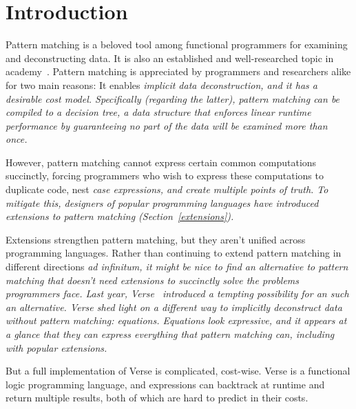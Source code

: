 \documentclass[manuscript,screen,review, 12pt, nonacm]{acmart}
\begin{document}
\section{Introduction}

Pattern matching is a beloved tool among functional programmers for examining
and deconstructing data. 
It is also an established and well-researched topic in
academy~\citep{burton1993pattern, palao1996new, wadler1987views, macqueen1985tree,
bpc}. Pattern matching is appreciated by programmers and researchers alike for
two main reasons: It enables \it{implicit} data deconstruction, and it has a
desirable cost model. Specifically (regarding the latter), pattern matching can
be compiled to a \it{decision tree}, a data structure that enforces linear
runtime performance by guaranteeing no part of the data will be examined more
than once.~\citep{maranget}

However, pattern matching cannot express certain common computations succinctly,
forcing programmers who wish to express these computations to duplicate code,
nest \it{case} expressions, and create multiple points of truth. To mitigate
this, designers of popular programming languages have introduced \it{extensions}
to pattern matching (Section~\ref{extensions}). 

Extensions strengthen pattern matching, but they aren't unified across
programming languages. Rather than continuing to extend pattern matching in
different directions \it{ad infinitum}, it might be nice to find an alternative
to pattern matching that doesn't need extensions to succinctly solve the
problems programmers face. Last year, Verse~\citep{verse} introduced
a tempting possibility for an such an alternative. Verse shed light on a
different way to implicitly deconstruct data without pattern matching:
\it{equations}. Equations look expressive, and it appears at a glance that they
can express everything that pattern matching can, including with popular
extensions. 

But a full implementation of Verse is complicated, cost-wise. Verse is a
functional logic programming language, and expressions can backtrack at runtime
and return multiple results, both of which are hard to predict in their costs. 

\end{document}
